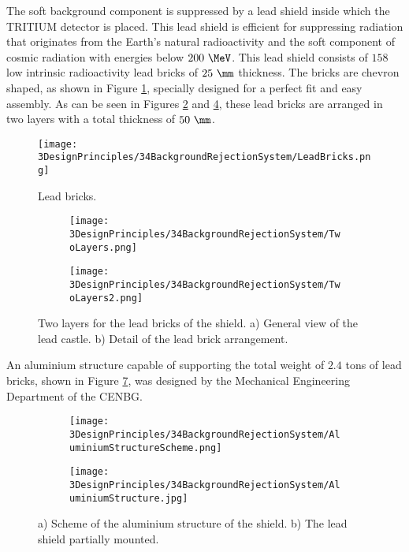 The soft background component is suppressed by a lead shield inside which the TRITIUM detector is placed. This lead shield is efficient for suppressing radiation that originates from the Earth's natural radioactivity and the soft component of cosmic radiation with energies below $200~\MeV$. This lead shield consists of $158$ low intrinsic radioactivity lead bricks of $25~\mm$ thickness. The bricks are chevron shaped, as shown in Figure \ref{fig:LeadBrick}, specially designed for a perfect fit and easy assembly. As can be seen in Figures \ref{subfig:TwoLayers} and \ref{fig:LeadBricksAndArrangement}, these lead bricks are arranged in two layers with a total thickness of $50~\mm$. 
\begin{figure}[h]
\texttt{[image: 3DesignPrinciples/34BackgroundRejectionSystem/LeadBricks.png]}
\centering
\caption{Lead bricks.\label{fig:LeadBrick}}
\end{figure}
\begin{figure}[h]
\centering
    \begin{subfigure}[b]{0.5\textwidth}
    \centering
    \texttt{[image: 3DesignPrinciples/34BackgroundRejectionSystem/TwoLayers.png]}  
    \caption{\label{subfig:TwoLayers}}
    \end{subfigure}
    \hfill
    \begin{subfigure}[b]{0.4\textwidth}
    \centering
    \texttt{[image: 3DesignPrinciples/34BackgroundRejectionSystem/TwoLayers2.png]}  
    \caption{\label{subfig:TwoLayers2}}
    \end{subfigure}
 \caption{Two layers for the lead bricks of the shield. a) General view of the lead castle. b) Detail of the lead brick arrangement.}
 \label{fig:LeadBricksAndArrangement}
\end{figure}
An aluminium structure capable of supporting the total weight of $2.4$ tons of lead bricks, shown in Figure \ref{fig:AluminiumStructure}, was designed by the Mechanical Engineering Department of the CENBG.
\begin{figure}
\centering
    \begin{subfigure}[b]{0.5\textwidth}
    \centering
    \texttt{[image: 3DesignPrinciples/34BackgroundRejectionSystem/AluminiumStructureScheme.png]}  
    \caption{\label{subfig:AluminiumStructureScheme}}
    \end{subfigure}
    \hfill
    \begin{subfigure}[b]{0.45\textwidth}
    \centering
    \texttt{[image: 3DesignPrinciples/34BackgroundRejectionSystem/AluminiumStructure.jpg]}  
    \caption{\label{subfig:AluminiumStructure}}
    \end{subfigure}
    \caption{a) Scheme of the aluminium structure of the shield. b) The lead shield partially mounted.}
 \label{fig:AluminiumStructure}
\end{figure}
